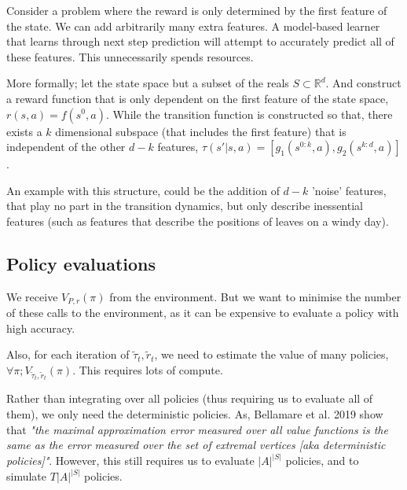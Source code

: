 Consider a problem where the reward is only determined by the first feature of the state.
We can add arbitrarily many extra features. A model-based learner that learns through next step prediction will attempt to
accurately predict all of these features. This unnecessarily spends resources.

More formally; let the state space but a subset of the reals $S \subset \mathbb R^d$.
And construct a reward function that is only dependent on the first feature of the state space, $r(s, a) = f(s^0, a)$.
While the transition function is constructed so that, there exists a $k$ dimensional subspace (that includes the first feature)
that is independent of the other $d-k$ features, $\tau(s'|s, a) = [g_1(s^{0:k}, a), g_2(s^{k:d}, a)]$.

An example with this structure, could be the addition of $d-k$ 'noise' features,
that play no part in the transition dynamics, but only describe inessential features
(such as features that describe the positions of leaves on a windy day).

%

\subsection{Policy evaluations}

We receive $V_{P, r}(\pi)$ from the environment. But we want to minimise the number
of these calls to the environment, as it can be expensive to evaluate a policy with high accuracy.

Also, for each iteration of $\tilde \tau_t, \tilde r_t$, we need to estimate the
value of many policies, $\forall \pi; V_{\tilde \tau_t, \tilde r_t}(\pi)$. This requires lots of compute.

Rather than integrating over all policies (thus requiring us to evaluate all of them),
we only need the deterministic policies. As, Bellamare et al. 2019 show that \textit{"the maximal approximation error
measured over all value functions is the same as the error measured over the set of extremal vertices [aka deterministic policies]"}\cite{Bellemare2019b}.
However, this still requires us to evaluate $|A|^{|S|}$ policies, and to simulate $T |A|^{|S|}$ policies. \footnotemark

